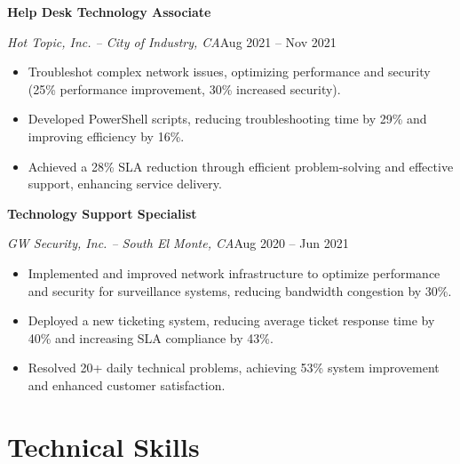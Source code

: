\documentclass[a4paper]{article}
\begin{document}
\begin{minipage}[t]{0.62\textwidth}
    \vspace{0.5em}
    \textbf{Help Desk Technology Associate}\par
    \textit{Hot Topic, Inc. -- City of Industry, CA}\hfill Aug 2021 -- Nov 2021

    \begin{itemize}[noitemsep,nolistsep]
        \item Troubleshot complex network issues, optimizing performance and security (25\% performance improvement, 30\% increased security).
        \item Developed PowerShell scripts, reducing troubleshooting time by 29\% and improving efficiency by 16\%.
        \item Achieved a 28\% SLA reduction through efficient problem-solving and effective support, enhancing service delivery.
    \end{itemize}

    \vspace{0.5em}
    \textbf{Technology Support Specialist}\par
    \textit{GW Security, Inc. -- South El Monte, CA}\hfill Aug 2020 -- Jun 2021

    \begin{itemize}[noitemsep,nolistsep]
        \item Implemented and improved network infrastructure to optimize performance and security for surveillance systems, reducing bandwidth congestion by 30\%.
        \item Deployed a new ticketing system, reducing average ticket response time by 40\% and increasing SLA compliance by 43\%.
        \item Resolved 20+ daily technical problems, achieving 53\% system improvement and enhanced customer satisfaction.
    \end{itemize}

    \section{Technical Skills}
    \begin{itemize}
        \apptechnicalskills{}
    \end{itemize}
\end{minipage}
\end{document}
